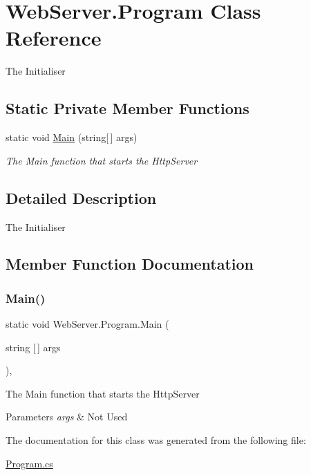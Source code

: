 \hypertarget{class_web_server_1_1_program}{}\section{Web\+Server.\+Program Class Reference}
\label{class_web_server_1_1_program}


The Initialiser  


\subsection*{Static Private Member Functions}
\begin{DoxyCompactItemize}
\item 
static void \hyperlink{class_web_server_1_1_program_a2a54edf2719a4715e7efa96f89ab5260}{Main} (string\mbox{[}$\,$\mbox{]} args)
\begin{DoxyCompactList}\small\item\em The Main function that starts the Http\+Server \end{DoxyCompactList}\end{DoxyCompactItemize}


\subsection{Detailed Description}
The Initialiser 



\subsection{Member Function Documentation}
\mbox{\label{class_web_server_1_1_program_a2a54edf2719a4715e7efa96f89ab5260}} 
\subsubsection{\texorpdfstring{Main()}{Main()}}
{\footnotesize\ttfamily static void Web\+Server.\+Program.\+Main (\begin{DoxyParamCaption}\item[{string \mbox{[}$\,$\mbox{]}}]{args }\end{DoxyParamCaption})\hspace{0.3cm}{\ttfamily [static]}, {\ttfamily [private]}}



The Main function that starts the Http\+Server 


\begin{DoxyParams}{Parameters}
{\em args} & Not Used\\
\hline
\end{DoxyParams}


The documentation for this class was generated from the following file\+:\begin{DoxyCompactItemize}
\item 
\hyperlink{_program_8cs}{Program.\+cs}\end{DoxyCompactItemize}
